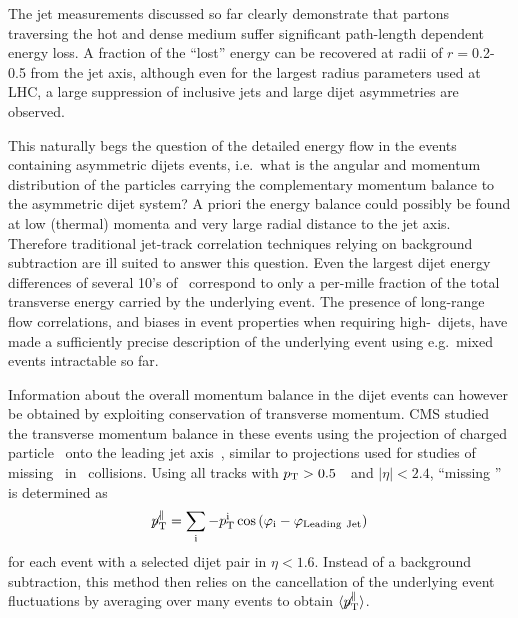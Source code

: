 The jet measurements discussed so far clearly demonstrate that partons traversing the hot and dense
medium suffer significant path-length dependent energy loss. A fraction of the ``lost'' energy
can be recovered at radii of $r=$0.2-0.5 from the jet axis, although even for the largest radius
parameters used at LHC, a large suppression of inclusive jets and large dijet asymmetries are
observed.

This naturally begs the question of the detailed energy flow in the events containing asymmetric
dijets events, i.e.\ what is the angular and momentum distribution of the particles carrying
the complementary momentum balance to the asymmetric dijet system? A priori the energy balance
could possibly be found at low (thermal) momenta and very large radial distance to the jet axis.
Therefore traditional jet-track correlation techniques relying on background subtraction are ill suited
to answer this question. Even the largest dijet energy differences of several 10's of \GeV\
correspond to only a per-mille fraction of the total transverse energy carried by the underlying 
event. The presence of long-range flow correlations, and biases in event properties when requiring 
high-\pT\ dijets, have made a sufficiently precise description of the underlying event using e.g.\ 
mixed events intractable so far.

Information about the overall momentum balance in the dijet events can however be obtained by exploiting
conservation of transverse momentum. CMS studied the transverse momentum balance in these events
using the projection of charged particle \pT\ onto the leading 
jet axis~\cite{Chatrchyan:2011sx}, similar to projections used for studies of missing \pT\ in \pp\
collisions.  Using all tracks with $\mbox{$p_{\mathrm{T}}$} > 0.5$~\GeVc\ and $|\eta| < 2.4$, 
``missing \pT'' is determined as 
\begin{equation}
\displaystyle{\not} p_{\mathrm{T}}^{\parallel} =
\sum_{\rm i}{ -p_{\mathrm{T}}^{\rm i}\cos{(\varphi_{\rm i}-\varphi_{\rm Leading\ Jet})}}
\end{equation}
for each event with a selected dijet pair in $\eta < 1.6$.
Instead of a background subtraction, this method then relies on the cancellation of the
underlying event fluctuations by averaging over many events to obtain
$\langle \displaystyle{\not} p_{\mathrm{T}}^{\parallel} \rangle$.


